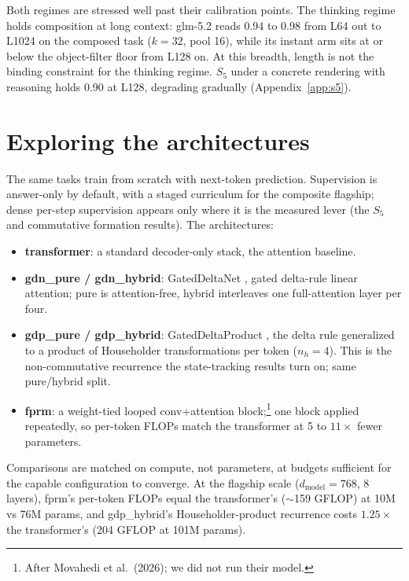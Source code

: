 \documentclass[11pt]{article}
\newcommand{\Sfive}{$S_5$}
\begin{document}
Both regimes are stressed well past their calibration points. The thinking regime holds
composition at long context: glm-5.2 reads 0.94 to 0.98 from L64 out to L1024 on the composed
task ($k=32$, pool 16), while its instant arm sits at or below the object-filter floor from
L128 on. At this breadth, length is not the binding constraint for the thinking regime.
\Sfive{} under a concrete rendering with reasoning holds 0.90 at L128, degrading gradually
(Appendix~\ref{app:s5}).

\section{Exploring the architectures}

The same tasks train from scratch with next-token prediction. Supervision is answer-only by
default, with a staged curriculum for the composite flagship; dense per-step supervision
appears only where it is the measured lever (the \Sfive{} and commutative formation results).
The architectures:

\begin{itemize}
\item \textbf{transformer}: a standard decoder-only stack, the attention baseline.
\item \textbf{gdn\_pure / gdn\_hybrid}: GatedDeltaNet \citep{yang2024gated}, gated delta-rule
  linear attention; pure is attention-free, hybrid interleaves one full-attention layer per
  four.
\item \textbf{gdp\_pure / gdp\_hybrid}: GatedDeltaProduct \citep{siems2025deltaproduct}, the
  delta rule generalized to a product of Householder transformations per token ($n_h=4$). This
  is the non-commutative recurrence the state-tracking results turn on; same pure/hybrid
  split.
\item \textbf{fprm}: a weight-tied looped conv+attention block;\footnote{After Movahedi et
  al.\ (2026); we did not run their model.} one block applied repeatedly, so per-token FLOPs
  match the transformer at 5 to $11\times$ fewer parameters.
\end{itemize}

Comparisons are matched on compute, not parameters, at budgets sufficient for the capable
configuration to converge. At the flagship scale ($d_{\mathrm{model}}=768$, 8 layers), fprm's
per-token FLOPs equal the transformer's ($\sim$159 GFLOP) at 10M vs 76M params, and
gdp\_hybrid's Householder-product recurrence costs $1.25\times$ the transformer's (204 GFLOP
at 101M params).
\end{document}
